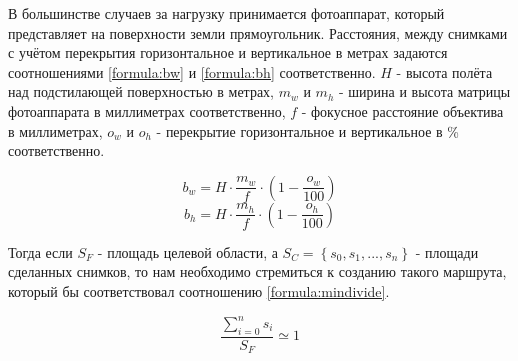 
В большинстве случаев за нагрузку принимается фотоаппарат, который представляет на поверхности земли прямоугольник. Расстояния, между снимками с учётом перекрытия горизонтальное и вертикальное в метрах задаются соотношениями \ref{formula:bw} и \ref{formula:bh} соответственно. $H$ - высота полёта над подстилающей поверхностью в метрах, $m_w$ и $m_h$ - ширина и высота матрицы фотоаппарата в миллиметрах соответственно, $f$ - фокусное расстояние объектива в миллиметрах, $o_w$ и $o_h$ - перекрытие горизонтальное и вертикальное в \% соответственно.

\begin{equation}
b_w=H\cdot\frac{m_w}{f}\cdot\left( 1 - \frac{o_w}{100}\right) 
\label{formula:bw}
\end{equation}
\begin{equation}
b_h=H\cdot\frac{m_h}{f}\cdot\left( 1 - \frac{o_h}{100}\right) 
\label{formula:bh}
\end{equation}

Тогда если $S_F$ - площадь целевой области, а $S_C=\left\lbrace s_0, s_1,...,s_n\right\rbrace$ - площади сделанных снимков, то нам необходимо стремиться к созданию такого маршрута, который бы соответствовал соотношению \ref{formula:mindivide}.

\begin{equation}
\frac{\sum_{i=0}^{n} s_i}{S_F} \simeq 1
\label{formula:mindivide}
\end{equation}

